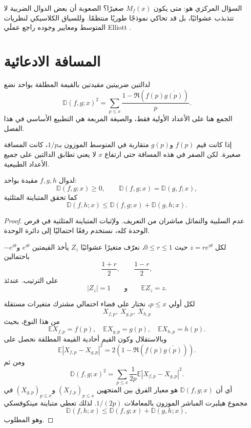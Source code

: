 السؤال المركزي هو: متى يكون \(M_f(x)\) صغيرًا؟ الصعوبة أن بعض الدوال الضربية لا تتذبذب عشوائيًا، بل قد تحاكي نموذجًا طوريًا منتظمًا. وللسياق الكلاسيكي لنظريات المتوسط ومعايير وجوده راجع عملَي Elliott \cite{elliott1975meanvalue,elliott1979probabilistic}.

\section{المسافة الادعائية}

\begin{definition}
\label{def:ch24-pretentious-distance}
لدالتين ضربيتين مقيدتين بالقيمة المطلقة بواحد نضع
\[
\mathbb D(f,g;x)^2
=
\sum_{p\le x}
\frac{1-\Re\!\left(f(p)\overline{g(p)}\right)}{p}.
\]
الجمع هنا على الأعداد الأولية فقط، والصيغة المربعة هي التطبيع الأساسي في هذا الفصل.
\end{definition}

إذا كانت قيم \(f(p)\) و\(g(p)\) متقاربة في المتوسط الموزون بـ\(1/p\)، كانت المسافة صغيرة. لكن الصفر في هذه المسافة حتى ارتفاع \(x\) لا يعني تطابق الدالتين على جميع الأعداد الطبيعية.

\begin{proposition}
\label{prop:ch24-distance-properties}
\provedhere
لدوال \(f,g,h\) مقيدة بواحد:
\[
\mathbb D(f,g;x)\ge0,
\qquad
\mathbb D(f,g;x)=\mathbb D(g,f;x),
\]
كما تحقق المتباينة المثلثية
\[
\mathbb D(f,h;x)
\le
\mathbb D(f,g;x)+\mathbb D(g,h;x).
\]
\end{proposition}

\begin{proof}
عدم السلبية والتماثل مباشران من التعريف. ولإثبات المتباينة المثلثية في قرص الوحدة كله، نستخدم رفعًا احتماليًا إلى دائرة الوحدة.

لكل \(z=re^{i\theta}\) حيث \(0\le r\le1\)، نعرّف متغيرًا عشوائيًا \(Z_z\) يأخذ القيمتين \(e^{i\theta}\) و\(-e^{i\theta}\) باحتمالين
\[
\frac{1+r}{2},
\qquad
\frac{1-r}{2},
\]
على الترتيب. عندئذ
\[
|Z_z|=1
\qquad\text{و}\qquad
\mathbb E Z_z=z.
\]

لكل أولي \(p\le x\)، نختار على فضاء احتمالي مشترك متغيرات مستقلة
\[
X_{f,p},\ X_{g,p},\ X_{h,p}
\]
من هذا النوع، بحيث
\[
\mathbb E X_{f,p}=f(p),
\quad
\mathbb E X_{g,p}=g(p),
\quad
\mathbb E X_{h,p}=h(p).
\]
وبالاستقلال وكون القيم أحادية القيمة المطلقة نحصل على
\[
\mathbb E\left|X_{f,p}-X_{g,p}\right|^2
=
2\left(1-\Re\!\left(f(p)\overline{g(p)}\right)\right).
\]
ومن ثم
\[
\mathbb D(f,g;x)^2
=
\sum_{p\le x}\frac{1}{2p}
\mathbb E\left|X_{f,p}-X_{g,p}\right|^2.
\]
أي أن \(\mathbb D(f,g;x)\) هو معيار الفرق بين المتجهين
\((X_{f,p})_{p\le x}\) و\((X_{g,p})_{p\le x}\)
في مجموع هيلبرت المباشر الموزون بالمعاملات \(1/(2p)\). لذلك تعطي متباينة مينكوفسكي
\[
\mathbb D(f,h;x)
\le
\mathbb D(f,g;x)+\mathbb D(g,h;x),
\]
وهو المطلوب.
\end{proof}

